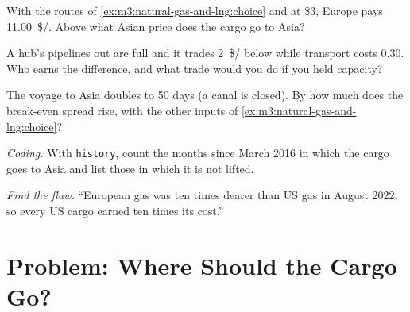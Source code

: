 \begin{exercise}[$\star\star$]\label{exo:m3:natural-gas-and-lng:4}
With the routes of \cref{ex:m3:natural-gas-and-lng:choice} and  at \$3, Europe
pays \qty{11.00}{\$/\mmbtu}. Above what Asian price does the cargo go to Asia?
\end{exercise}

\begin{exercise}[$\star\star$]\label{exo:m3:natural-gas-and-lng:5}
A hub's pipelines out are full and it trades \qty{2}{\$/\mmbtu} below  while
transport costs \qty{0.30}{}. Who earns the difference, and what trade would you do if you
held capacity?
\end{exercise}

\begin{exercise}[$\star\star$]\label{exo:m3:natural-gas-and-lng:6}
The voyage to Asia doubles to 50 days (a canal is closed). By how much does the break-even
spread rise, with the other inputs of \cref{ex:m3:natural-gas-and-lng:choice}?
\end{exercise}

\begin{exercise}[$\star\star\star$]\label{exo:m3:natural-gas-and-lng:7}
\emph{Coding.} With \texttt{history}, count the months since March 2016 in which the
cargo goes to Asia and list those in which it is not lifted.
\end{exercise}

\begin{exercise}[$\star\star\star$]\label{exo:m3:natural-gas-and-lng:8}
\emph{Find the flaw.} ``European gas was ten times dearer than US gas in August 2022, so
every US cargo earned ten times its cost.''
\end{exercise}

\section{Problem: Where Should the Cargo Go?}

